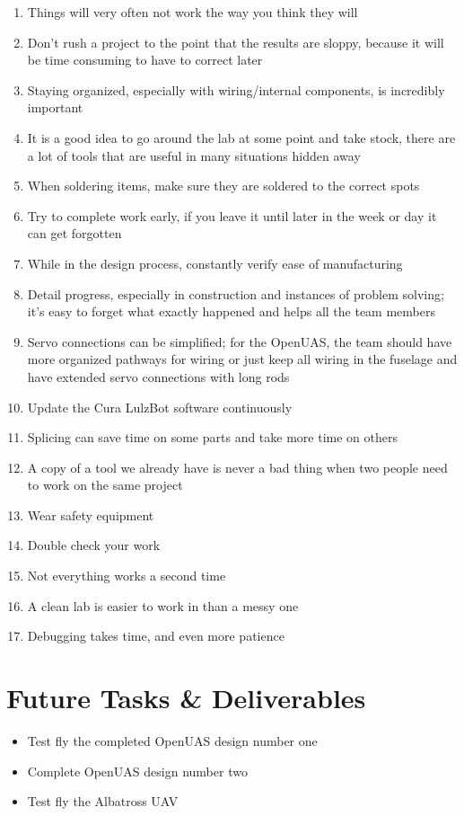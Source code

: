 \documentclass{article}
\begin{document}
\begin{enumerate}
\item Things will very often not work the way you think they will
\item Don't rush a project to the point that the results are sloppy, because it will be time consuming to have to correct later
\item Staying organized, especially with wiring/internal components, is incredibly important
\item It is a good idea to go around the lab at some point and take stock, there are a lot of tools that are useful in many situations hidden away
\item When soldering items, make sure they are soldered to the correct spots
\item Try to complete work early, if you leave it until later in the week or day it can get forgotten
\item While in the design process, constantly verify ease of manufacturing
\item Detail progress, especially in construction and instances of problem solving; it's easy to forget what exactly happened and helps all the team members
\item Servo connections can be simplified; for the OpenUAS, the team should have more organized pathways for wiring or just keep all wiring in the fuselage and have extended servo connections with long rods
\item Update the Cura LulzBot software continuously
\item Splicing can save time on some parts and take more time on others
\item A copy of a tool we already have is never a bad thing when two people need to work on the same project
\item Wear safety equipment 
\item Double check your work
\item Not everything works a second time
\item A clean lab is easier to work in than a messy one
\item Debugging takes time, and even more patience 

\end{enumerate}

\section{Future Tasks \& Deliverables}
\begin{itemize}
\item Test fly the completed OpenUAS design number one
\item Complete OpenUAS design number two
\item Test fly the Albatross UAV
\end{itemize}
\end{document}
